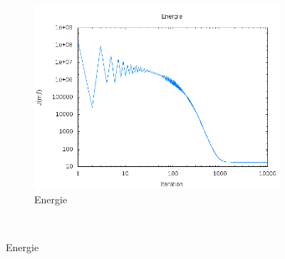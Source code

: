 \documentclass{beamer}
\begin{document}
\begin{frame}
\begin{figure}[!h]
\begin{subfigure}[b]{0.3\linewidth}
	\end{subfigure}
	~
	\begin{subfigure}[b]{0.35\linewidth}
	\includegraphics[width=\textwidth]{img/2DGaussian/energie.png}
	\caption{Energie}
	\end{subfigure}
	~
	

\end{figure}
\end{frame}
\end{document}
